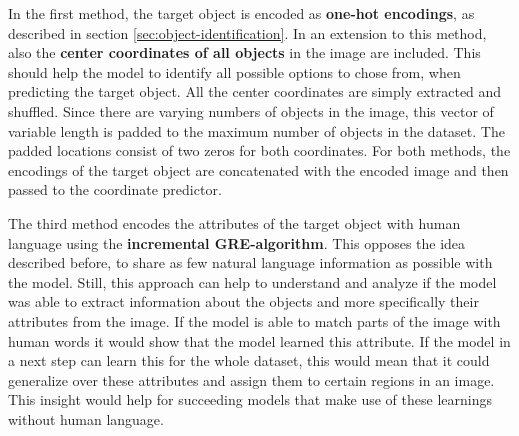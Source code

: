 In the first method, the target object is encoded as \textbf{one-hot encodings}, as described in section \ref{sec:object-identification}.
In an extension to this method, also the \textbf{center coordinates of all objects} in the image are included.
This should help the model to identify all possible options to chose from, when predicting the target object.
All the center coordinates are simply extracted and shuffled.
Since there are varying numbers of objects in the image, this vector of variable length is padded to the maximum number of objects in the dataset.
The padded locations consist of two zeros for both coordinates.
For both methods, the encodings of the target object are concatenated with the encoded image and then passed to the coordinate predictor.

The third method encodes the attributes of the target object with human language using the \textbf{incremental GRE-algorithm}.
This opposes the idea described before, to share as few natural language information as possible with the model.
Still, this approach can help to understand and analyze if the model was able to extract information about the objects and more specifically their attributes from the image.
If the model is able to match parts of the image with human words it would show that the model learned this attribute.
If the model in a next step can learn this for the whole dataset, this would mean that it could generalize over these attributes and assign them to certain regions in an image.
This insight would help for succeeding models that make use of these learnings without human language.

